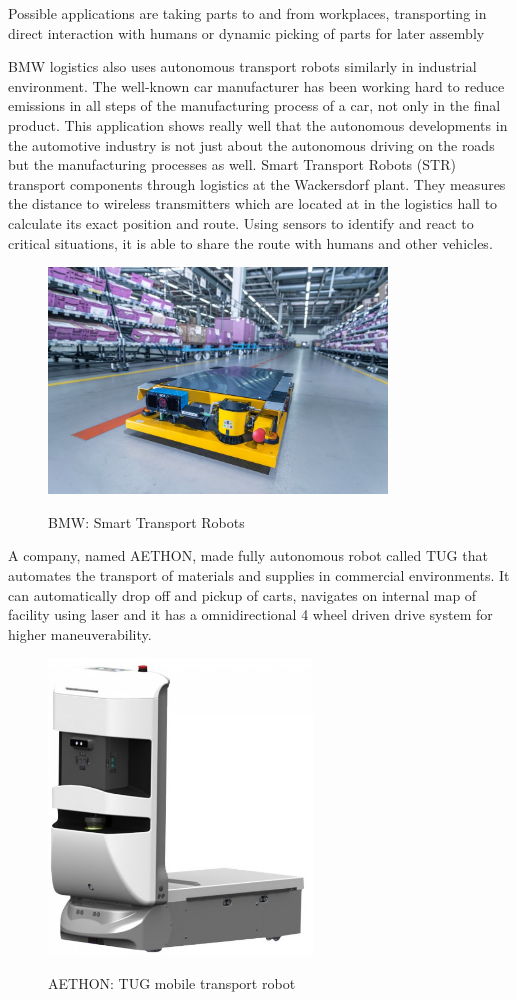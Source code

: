 \documentclass[12pt,english]{article}
\begin{document}
\noindent Possible applications are taking parts to and from workplaces, transporting in direct interaction with humans or dynamic picking of parts for later assembly

BMW logistics also uses autonomous transport robots similarly in industrial environment. The well-known car manufacturer has been working hard to reduce emissions in all steps of the manufacturing process of a car, not only in the final product. This application shows really well that the autonomous developments in the automotive industry is not just about the autonomous driving on the roads but the manufacturing processes as well. Smart Transport Robots (STR) transport components through logistics at the Wackersdorf plant. They measures the distance to wireless transmitters which are located at in the logistics hall to calculate its exact position and route. Using sensors to identify and react to critical situations, it is able to share the route with humans and other vehicles. \cite{bmw}

\begin{figure}[htb!]
	\centering
	\includegraphics[width=9cm]{figures/bmw.jpg}
	\label{bmw}
	\caption{BMW: Smart Transport Robots}
\end{figure}

A company, named AETHON, made fully autonomous robot called TUG that automates the transport of materials and supplies in commercial environments. It can automatically drop off and pickup of carts, navigates on internal map of facility using laser and it has a omnidirectional 4 wheel driven drive system for higher maneuverability.

\begin{figure}[htb!]
	\centering
	\includegraphics[width=7cm]{figures/tug.png}
	\label{bmw}
	\caption{AETHON: TUG mobile transport robot}
\end{figure}
\end{document}
